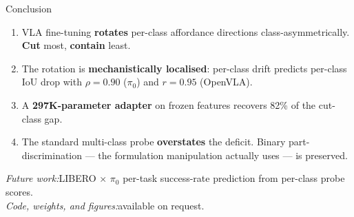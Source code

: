 \documentclass[10pt,aspectratio=169]{beamer}
\newcommand{\hl}[1]{\textcolor{emph}{\textbf{#1}}}
\begin{document}
\begin{frame}{Conclusion}
  \begin{enumerate}\setlength{\itemsep}{0.45em}
    \item VLA fine-tuning \hl{rotates} per-class affordance directions class-asymmetrically. \textbf{Cut} most, \textbf{contain} least.
    \item The rotation is \hl{mechanistically localised}: per-class drift predicts per-class IoU drop with $\rho = 0.90$ ($\pi_0$) and $r = 0.95$ (OpenVLA).
    \item A \hl{297K-parameter adapter} on frozen features recovers 82\% of the cut-class gap.
    \item The standard multi-class probe \hl{overstates} the deficit. Binary part-discrimination --- the formulation manipulation actually uses --- is preserved.
  \end{enumerate}

  \vspace{1.0em}
  {\small\itshape Future work:}\quad LIBERO $\times$ $\pi_0$ per-task success-rate prediction from per-class probe scores.\\
  {\small\itshape Code, weights, and figures:}\quad available on request.
\end{frame}
\end{document}
